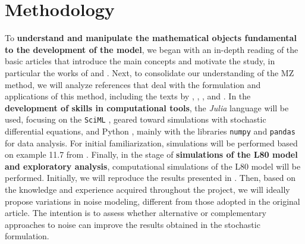 \documentclass[12pt]{article}
\begin{document}
\section*{Methodology}
To \textbf{understand and manipulate the mathematical objects fundamental to the development of the model}, we began with an in-depth reading of the basic articles that introduce the main concepts and motivate the study, in particular the works of \citet{Chekroun2017} and \citet{Chekroun2021}. Next, to consolidate our understanding of the MZ method, we will analyze references that deal with the formulation and applications of this method, including the texts by \citet{Gouasmi2017}, \citet{Chorin2000}, \citet{Chorin2002}, and \citet{Chorin2013}.
In the \textbf{development of skills in computational tools}, the \textit{Julia} \citep{julialang} language will be used, focusing on the \texttt{SciML} \citep{SDEJulia}, geared toward simulations with stochastic differential equations, and Python \citep{Python}, mainly with the libraries \texttt{numpy} \citep{numpy} and \texttt{pandas} \citep{pandas} for data analysis. For initial familiarization, simulations will be performed based on example 11.7 from \citep[p.~169]{Pavliotis2008}.
Finally, in the stage of \textbf{simulations of the L80 model and exploratory analysis}, computational simulations of the L80 model will be performed. Initially, we will reproduce the results presented in \citet{Chekroun2021}. Then, based on the knowledge and experience acquired throughout the project, we will ideally propose variations in noise modeling, different from those adopted in the original article. The intention is to assess whether alternative or complementary approaches to noise can improve the results obtained in the stochastic formulation.
\end{document}
